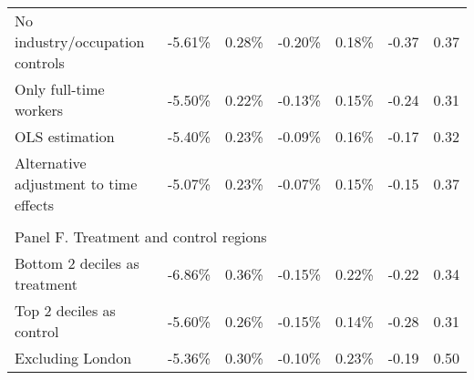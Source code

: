 \begin{table}[pth]
\begin{threeparttable}
\begin{tabular}{lcccccc}
No industry/occupation controls & -5.61\% & 0.28\% & -0.20\% & 0.18\% & -0.37 & 0.37 \\
Only full-time workers & -5.50\% & 0.22\% &	-0.13\% &	0.15\% & -0.24 & 0.31 \\
OLS estimation & -5.40\% & 0.23\% & -0.09\% & 0.16\% & -0.17 & 0.32 \\
Alternative adjustment to time effects & -5.07\% & 0.23\% & -0.07\% & 0.15\% & -0.15 & 0.37 \\
\\
\multicolumn{7}{l}{Panel F. Treatment and control regions} \\
Bottom 2 deciles as treatment & -6.86\% & 0.36\% & -0.15\% & 0.22\% & -0.22 & 0.34 \\
Top 2 deciles as control & -5.60\% & 0.26\% & -0.15\% & 0.14\% & -0.28 & 0.31 \\
Excluding London & -5.36\% & 0.30\% & -0.10\% & 0.23\% & -0.19 & 0.50 \\
\bottomrule
\end{tabular}
\par

\end{threeparttable}
\end{table}
